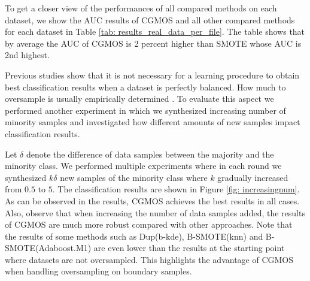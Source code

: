 \documentclass{iitthesis}
\begin{document}
%

To get a closer view of the performances of all compared methods on each dataset, we show the AUC results of CGMOS and all other compared methods for each dataset in Table \ref{tab: results_real_data_per_file}. The table shows that by average the AUC of CGMOS is 2 percent higher than SMOTE whose AUC is 2nd highest. 

Previous studies show that it is not necessary for a learning procedure to obtain best classification results when a dataset is perfectly balanced\cite{batista2004study}\cite{weiss2003learning}. How much to oversample is usually empirically determined \cite{chawla2004editorial}. To evaluate this aspect we performed another experiment in which we synthesized increasing number of minority samples and investigated how different amounts of new samples impact classification results.

Let $\delta$ denote the difference of data samples between the majority and the minority class. We performed multiple experiments where in each round we synthesized $k\delta$ new samples of the  minority class where $k$ gradually increased from $0.5$ to $5$. The classification results are shown in Figure \ref{fig: increasingnum}. As can be observed in the results, CGMOS achieves the best results in all cases. Also, observe that when increasing the number of data samples added, the results of CGMOS are much more robust compared with other approaches. Note that the results of some methods such as Dup(b-kde), B-SMOTE(knn) and B-SMOTE(Adaboost.M1) are even lower than the results at the starting point where datasets are not oversampled. This highlights the advantage of CGMOS when handling oversampling on boundary samples. 
\end{document}
